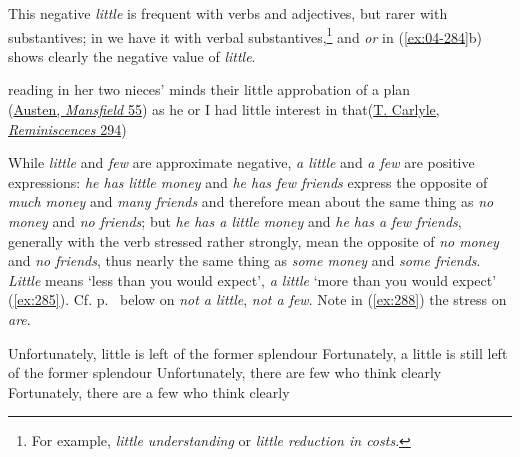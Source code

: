 This negative \textit{little} is frequent with verbs and adjectives, but rarer with substantives; in  we have it with verbal substantives,\footnote{For example, \textit{little understanding} or \textit{little reduction in costs}. \eds} %
and \textit{or} in (\ref{ex:04-284}b) shows clearly the negative value of \textit{little}. %

\ea \label{ex:04-284}
\ea reading in her two nieces' minds their
little approbation of a plan\\\hfill(\href{https://archive.org/details/mansfieldpark00aust_1/page/50/mode/2up?q=\%22reading+in+her+two\%22&view=theater}{Austen, \textit{Mansfield} 55}) %
\ex as he or I had little interest in that\hfill(\href{https://archive.org/details/reminiscences0000thom_e9a0/page/232/mode/2up?q=\%22as+he+or+I\%22&view=theater}{T. Carlyle, \textit{Reminiscences} 294})
\z
\z

While \textit{little} and \textit{few} are approximate negative, %
\textit{a little} and \textit{a few} are positive expressions: \textit{he has little money} and \textit{he has few friends} express the opposite of \textit{much money} and\textit{ many friends} and therefore mean about the same thing as \textit{no money} and \textit{no friends}; but \textit{he has a little money} and \textit{he has a few friends}, generally with the verb stressed rather strongly, mean the opposite of \textit{no money} and \textit{no friends}, thus nearly the same thing as \textit{some money} and \textit{some friends}. \textit{Little} means `less than you would expect', \textit{a little} `more than you would expect' (\ref{ex:285}). Cf. p.~\pageref{ch8-not-a-little} below on \textit{not a little}, \textit{not a few}. Note in (\ref{ex:288}) the stress on \textit{are}.

\ea \label{ex:285}
\ea Unfortunately, little is left of the former splendour
\ex Fortunately, a little is still left of the former splendour
\ex Unfortunately, there are few who think clearly
\ex Fortunately, there are a few who think clearly\label{ex:288}
\z
\z

